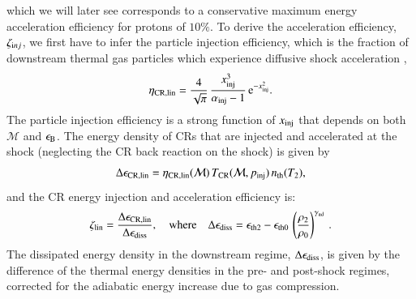 \documentclass[a4paper,fleqn,usenatbib]{mnras}
\newcommand\eb{\epsilon_\rmn{B}}
\begin{document}
which we will later see corresponds to a conservative maximum energy
acceleration efficiency for protons of $10\%$. To derive the
acceleration efficiency, $\zeta_{{\mathrm{i}}nj}$, we first have to infer the
particle injection efficiency, which is the fraction of downstream
thermal gas particles which experience diffusive shock acceleration
\citep[for details see ][]{pinzke13},
\begin{equation}
  \label{eq:eta}
  \eta_{\mathrm{CR,lin}} =
  \frac{4}{\sqrt{\pi}}\,\frac{x_{\mathrm{inj}}^3}{\alpha_{\mathrm{inj}}-1}\,
  {\mathrm{e}}^{-x_{\mathrm{inj}}^2}.
\end{equation}
The particle injection efficiency is a strong function of
$x_{\mathrm{inj}}$ that depends on both $\mathcal{M}$ and $\eb$. The
energy density of CRs that are injected and accelerated at the shock
(neglecting the CR back reaction on the shock) is given by
\begin{equation}
\label{eq:CR_energy} 
  \Delta\epsilon_{\mathrm{CR,lin}} =
  \eta_{\mathrm{CR,lin}}(\mathcal{M})\,T_{\mathrm{CR}}(\mathcal{M},p_{\mathrm{inj}})\,n_{\mathrm{th}}(T_2),
\end{equation}
and the CR energy injection and acceleration efficiency is:
\begin{equation}
  \zeta_{\mathrm{lin}} =
  \frac{\Delta\epsilon_{\mathrm{CR,lin}}}{\Delta\epsilon_{\mathrm{diss}}},
   \quad\mbox{where}\quad
  \Delta\epsilon_{\mathrm{diss}} = \epsilon_{\mathrm{th2}} - \epsilon_{\mathrm{th0}}\,\left(\frac{\rho_2}{\rho_0}\right)^{\gamma_{\mathrm{ad}}}\,.
\label{eqn:energy_frac}  
\end{equation}
The dissipated energy density in the downstream regime,
$\Delta\epsilon_{\mathrm{diss}}$, is given by the difference of the thermal
energy densities in the pre- and post-shock regimes, corrected for the
adiabatic energy increase due to gas compression.
\end{document}
